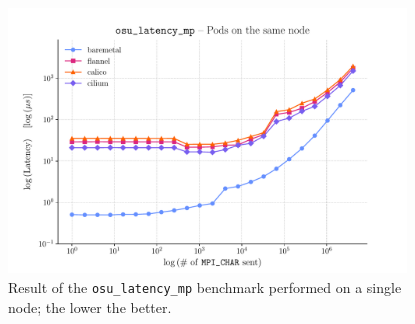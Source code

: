 \begin{figure}
  \centering
  \includegraphics[width=0.94\textwidth]{img/chpt3/latency_mp-1-node}
  \caption{Result of the \texttt{osu\_latency\_mp} benchmark performed on a single
    node; the lower the better.}
  \label{fig:latency-mp-1-node}
\end{figure}


